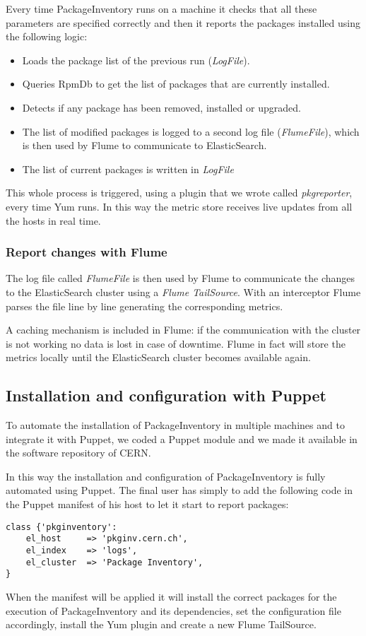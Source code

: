 Every time PackageInventory runs on a machine it checks that all these
parameters are specified correctly and then it reports the packages
installed using the following logic:

\begin{itemize}
    \item Loads the package list of the previous run (\textit{LogFile}).
    \item Queries RpmDb to get the list of packages that are currently
            installed.
    \item Detects if any package has been removed, installed or upgraded.
    \item The list of modified packages is logged to a second log file
            (\textit{FlumeFile}), which is then used by Flume to communicate
            to ElasticSearch.
    \item The list of current packages is written in \textit{LogFile}
\end{itemize}

This whole process is triggered, using a plugin that we wrote called
\textit{pkgreporter}, every time Yum runs. In this way the metric store
receives live updates from all the hosts in real time.

\subsubsection{Report changes with Flume}

The log file called \textit{FlumeFile} is then used by Flume to
communicate the changes to the ElasticSearch cluster using a \textit{Flume
TailSource}. With an interceptor Flume parses the file line by line
generating the corresponding metrics.

A caching mechanism is included in Flume: if the communication with the
cluster is not working no data is lost in case of downtime. Flume in fact
will store the metrics locally until the ElasticSearch cluster becomes
available again.

\subsection{Installation and configuration with Puppet}

To automate the installation of PackageInventory in multiple machines and
to integrate it with Puppet, we coded a Puppet module and we made it
available in the software repository of CERN.

In this way the installation and configuration of PackageInventory is
fully automated using Puppet. The final user has simply to add the
following code in the Puppet manifest of his host to let it start to
report packages:

\begin{lstlisting}[frame=single]
class {'pkginventory':
    el_host     => 'pkginv.cern.ch',
    el_index    => 'logs',
    el_cluster  => 'Package Inventory',
}
\end{lstlisting}

When the manifest will be applied it will install the correct packages for
the execution of PackageInventory and its dependencies, set the
configuration file accordingly, install the Yum plugin and create a new
Flume TailSource.
